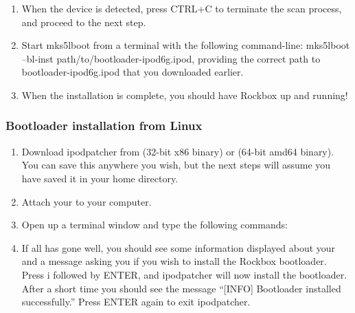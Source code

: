 {\begin{enumerate}
\item When the device is detected, press CTRL+C to terminate the scan
process, and proceed to the next step.

\item Start mks5lboot from a terminal with the following command-line:
mks5lboot --bl-inst path/to/bootloader-ipod6g.ipod, providing the
correct path to bootloader-ipod6g.ipod that you downloaded earlier.

\item When the installation is complete, you should have Rockbox up and
running!

\end{enumerate}

\subsubsection{Bootloader installation from Linux}

\begin{enumerate}

\item Download ipodpatcher from
 (32-bit x86
binary)
or 
(64-bit amd64 binary). You can save this anywhere you wish, but the
next steps will assume you have saved it in your home directory.

\item Attach your \dap{} to your computer.

\item Open up a terminal window and type the following commands:


\item If all has gone well, you should see some information displayed about
your \dap{} and a message asking you if you wish to install the Rockbox
bootloader. Press i followed by ENTER, and ipodpatcher will now install the
bootloader. After a short time you should see the message ``[INFO] Bootloader
installed successfully.'' Press ENTER again to exit ipodpatcher.

\end{enumerate}
}
